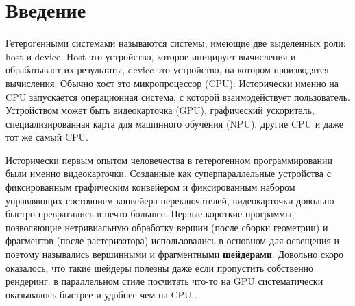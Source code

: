 \chapter*{Введение}                         %

Гетерогенными системами называются системы, имеющие две выделенных роли: host и device. Host это устройство, которое иницирует вычисления и обрабатывает их результаты, device это устройство, на котором производятся вычисления. Обычно хост это микропроцессор (CPU). Исторически именно на CPU запускается операционная система, с которой взаимодействует пользователь. Устройством может быть видеокарточка (GPU), графический ускоритель, специализированная карта для машинного обучения (NPU), другие CPU и даже тот же самый CPU.

Исторически первым опытом человечества в гетерогенном программировании были именно видеокарточки.
Созданные как суперпараллельные устройства с фиксированным графическим конвейером и фиксированным набором управляющих состоянием конвейера переключателей, видеокарточки довольно быстро превратились в нечто большее.
Первые короткие программы, позволяющие нетривиальную обработку вершин (после сборки геометрии) и фрагментов (после растеризатора) использовались в основном для освещения и поэтому назывались вершинными и фрагментными \textbf{шейдерами}. Довольно скоро оказалось, что такие шейдеры полезны даже если пропустить собственно рендеринг: в параллельном стиле посчитать что-то на GPU систематически оказывалось быстрее и удобнее чем на CPU \cite{Fang}.

